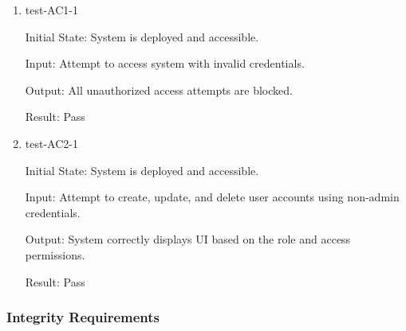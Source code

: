 \documentclass[12pt, titlepage]{article}
\begin{document}
\begin{enumerate}
\item test-AC1-1 \label{test-AC1-1}

Initial State: System is deployed and accessible.

Input: Attempt to access system with invalid credentials.

Output: All unauthorized access attempts are blocked.

Result: Pass

\item test-AC2-1 \label{test-AC2-1}

Initial State: System is deployed and accessible.

Input: Attempt to create, update, and delete user accounts using non-admin credentials.

Output: System correctly displays UI based on the role and access permissions.

Result: Pass

\end{enumerate}

\subsubsection{Integrity Requirements} \label{section:4.10.2}
\end{document}
